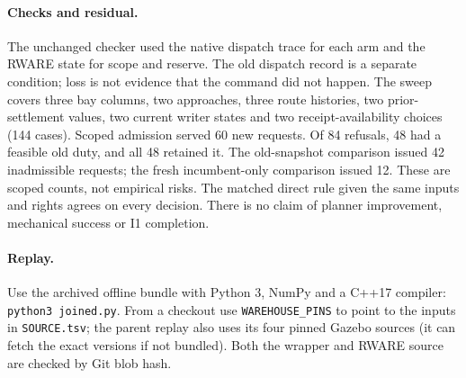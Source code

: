 \documentclass{article}
\begin{document}
\paragraph{Checks and residual.}
The unchanged checker used the native dispatch trace for each arm
and the RWARE state for scope and reserve. The old dispatch record is
a separate condition; loss is not evidence that the command did not
happen. The sweep covers three bay columns, two approaches, three
route histories, two prior-settlement values, two current writer
states and two receipt-availability choices (144 cases).
Scoped admission served 60 new requests. Of 84 refusals, 48 had a
feasible old duty, and all 48 retained it. The old-snapshot
comparison issued 42 inadmissible requests; the fresh incumbent-only
comparison issued 12. These are scoped counts, not empirical risks.
The matched direct rule given the same inputs and rights agrees
on every decision. There is no claim of planner improvement,
mechanical success or I1 completion.

\paragraph{Replay.}
Use the archived offline bundle with Python 3, NumPy and a C++17
compiler: \texttt{python3 joined.py}. From a checkout use
\texttt{WAREHOUSE\_PINS} to point to the inputs in
\texttt{SOURCE.tsv}; the parent replay also uses its four pinned Gazebo
sources (it can fetch the exact versions if not bundled). Both the
wrapper and RWARE source are checked by Git blob hash.
\end{document}
